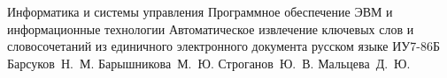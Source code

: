 \makethesistitle
{Информатика и системы управления} %
{Программное обеспечение ЭВМ и информационные технологии} %
{Автоматическое извлечение ключевых слов и словосочетаний из единичного электронного документа русском языке} %
{ИУ7-86Б} %
{Барсуков~Н.~М.} %
{Барышникова~М.~Ю.} %
{Строганов~Ю.~В.} %
{} %
{Мальцева~Д.~Ю.} %
